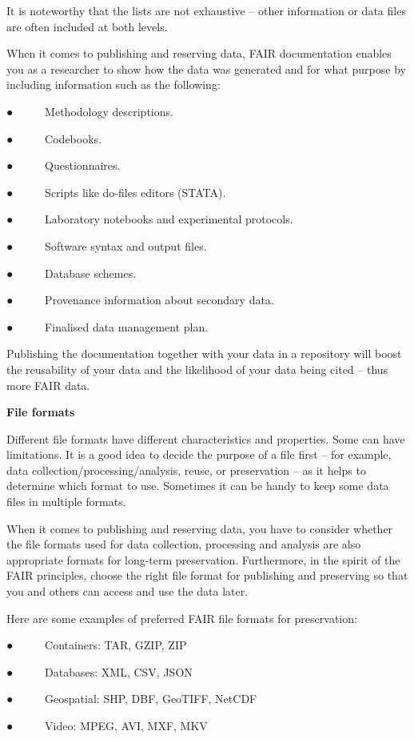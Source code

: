 \documentclass[
]{book}
\begin{document}
It is noteworthy that the lists are not exhaustive -- other information or data files are often included at both levels.

When it comes to publishing and reserving data, FAIR documentation enables you as a researcher to show how the data was generated and for what purpose by including information such as the following:

● ~ ~ ~ Methodology descriptions.

● ~ ~ ~ Codebooks.

● ~ ~ ~ Questionnaires.

● ~ ~ ~ Scripts like do-files editors (STATA).

● ~ ~ ~ Laboratory notebooks and experimental protocols.

● ~ ~ ~ Software syntax and output files.

● ~ ~ ~ Database schemes.

● ~ ~ ~ Provenance information about secondary data.

● ~ ~ ~ Finalised data management plan.

Publishing the documentation together with your data in a repository will boost the reusability of your data and the likelihood of your data being cited -- thus more FAIR data.

\textbf{File formats}

Different file formats have different characteristics and properties. Some can have limitations. It is a good idea to decide the purpose of a file first -- for example, data collection/processing/analysis, reuse, or preservation -- as it helps to determine which format to use. Sometimes it can be handy to keep some data files in multiple formats.

When it comes to publishing and reserving data, you have to consider whether the file formats used for data collection, processing and analysis are also appropriate formats for long-term preservation. Furthermore, in the spirit of the FAIR principles, choose the right file format for publishing and preserving so that you and others can access and use the data later.

Here are some examples of preferred FAIR file formats for preservation:

● ~ ~ ~ Containers: TAR, GZIP, ZIP

● ~ ~ ~ Databases: XML, CSV, JSON

● ~ ~ ~ Geospatial: SHP, DBF, GeoTIFF, NetCDF

● ~ ~ ~ Video: MPEG, AVI, MXF, MKV
\end{document}
